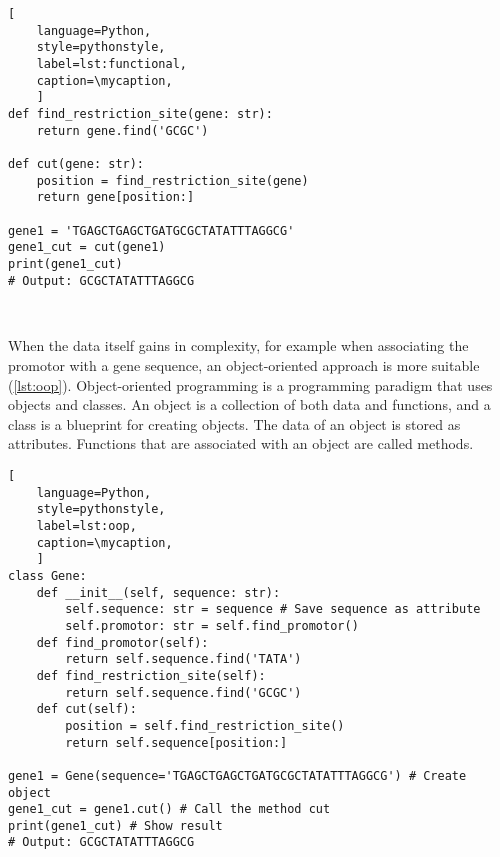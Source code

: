 \def\mycaption{ Example of functional programming in Python. The code
    defines a function called ``\texttt{find\_restriction\_site}'' that
    finds the position of a restriction site in a gene. The function
    ``\texttt{cut}'' uses the function ``\texttt{find\_restriction\_site}''
    to cut the gene at the restriction site.}
\begin{lstlisting}[
    language=Python,
    style=pythonstyle,
    label=lst:functional,
    caption=\mycaption,
    ]
def find_restriction_site(gene: str):
    return gene.find('GCGC')
    
def cut(gene: str):
    position = find_restriction_site(gene)
    return gene[position:]   
    
gene1 = 'TGAGCTGAGCTGATGCGCTATATTTAGGCG'
gene1_cut = cut(gene1)
print(gene1_cut)
# Output: GCGCTATATTTAGGCG
    
    
\end{lstlisting}


When the data itself gains in complexity, for example when associating the
promotor with a gene sequence, an object-oriented approach is more suitable
(\autoref{lst:oop}). Object-oriented programming is a programming paradigm that
uses objects and classes. An object is a collection of both data and functions,
and a class is a blueprint for creating objects. The data of an object is stored
as attributes. Functions that are associated with an object are called methods.

\def\mycaption{ Example of object oriented programming in python. The class is
    called ``\texttt{Gene}'' and has four methods, ``\texttt{\_\_init\_\_}'',
    ``\texttt{find\_promotor}'', ``\texttt{find\_restriction\_site}'' and
    ``\texttt{cut}''. The function ``\texttt{\_\_init\_\_}'' is called when
    creating (``initializing'') an object, which fills the object with
    user-defined data. The parameter ``\texttt{self}'' is used to reference the
    object itself internally. ``\texttt{find\_promotor}'' is a
    method that finds the position of the promotor in the gene and is called
    during object initialization. }
\begin{lstlisting}[
    language=Python,
    style=pythonstyle,
    label=lst:oop,
    caption=\mycaption,
    ]
class Gene:
    def __init__(self, sequence: str):
        self.sequence: str = sequence # Save sequence as attribute
        self.promotor: str = self.find_promotor() 
    def find_promotor(self):
        return self.sequence.find('TATA')
    def find_restriction_site(self):
        return self.sequence.find('GCGC')
    def cut(self):
        position = self.find_restriction_site()
        return self.sequence[position:]

gene1 = Gene(sequence='TGAGCTGAGCTGATGCGCTATATTTAGGCG') # Create object
gene1_cut = gene1.cut() # Call the method cut
print(gene1_cut) # Show result
# Output: GCGCTATATTTAGGCG
\end{lstlisting}


